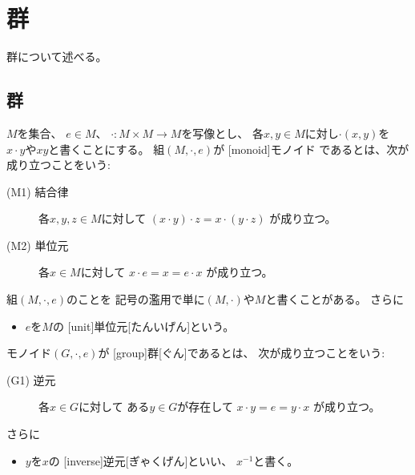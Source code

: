 \documentclass[report]{jlreq}
\begin{document}
%
\chapter{群}

群について述べる。

%
\section{群}

\begin{definition}[モノイド]
    $M$を集合、
    $e \in M$、
    $\cdot \colon M \times M \to M$を写像とし、
    各$x, y \in M$に対し$\cdot (x, y)$を
    $x \cdot y$や$xy$と書くことにする。
    組$(M, \cdot, e)$が
    [monoid]{モノイド}
    であるとは、次が成り立つことをいう:
    \begin{description}
        \item[(M1) 結合律]
            各$x, y, z \in M$に対して
            $(x \cdot y) \cdot z = x \cdot (y \cdot z)$
            が成り立つ。
        \item[(M2) 単位元]
            各$x \in M$に対して
            $x \cdot e = x = e \cdot x$
            が成り立つ。
    \end{description}
    組$(M, \cdot, e)$のことを
    記号の濫用で単に$(M, \cdot)$や$M$と書くことがある。
    さらに
    \begin{itemize}
        \item $e$を$M$の
            [unit]{単位元}[たんいげん]という。
    \end{itemize}
\end{definition}

\begin{definition}[群]
    モノイド$(G, \cdot, e)$が
    [group]{群}[ぐん]であるとは、
    次が成り立つことをいう:
    \begin{description}
        \item[(G1) 逆元]
            各$x \in G$に対して
            ある$y \in G$が存在して
            $x \cdot y = e = y \cdot x$
            が成り立つ。
    \end{description}
    さらに
    \begin{itemize}
        \item $y$を$x$の
            [inverse]{逆元}[ぎゃくげん]といい、
            $x^{-1}$と書く。
    \end{itemize}
\end{definition}
\end{document}
